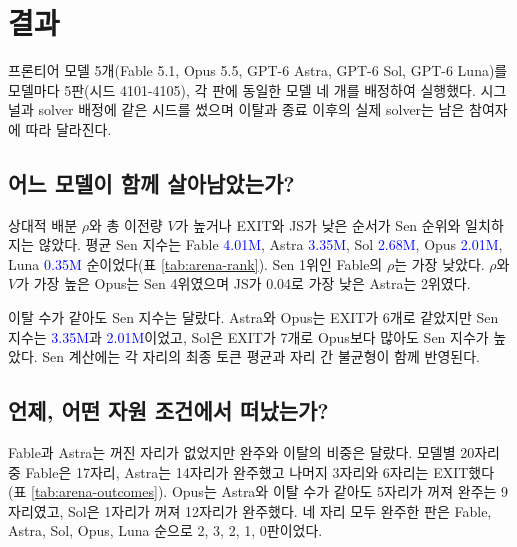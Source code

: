 \section{결과}\label{sec:results-arena}

프론티어 모델 5개(Fable 5.1, Opus 5.5, GPT-6 Astra, GPT-6 Sol, GPT-6 Luna)를 모델마다 5판(시드 4101-4105), 각 판에 동일한 모델 네 개를 배정하여 실행했다. 시그널과 solver 배정에 같은 시드를 썼으며 이탈과 종료 이후의 실제 solver는 남은 참여자에 따라 달라진다. 

\subsection{어느 모델이 함께 살아남았는가?}

상대적 배분 $\rho$와 총 이전량 $V$가 높거나 EXIT와 JS가 낮은 순서가 Sen 순위와 일치하지는 않았다. 평균 Sen 지수는 Fable \textcolor{blue}{4.01M}, Astra \textcolor{blue}{3.35M}, Sol \textcolor{blue}{2.68M}, Opus \textcolor{blue}{2.01M}, Luna \textcolor{blue}{0.35M} 순이었다(표 \ref{tab:arena-rank}). Sen 1위인 Fable의 $\rho$는 가장 낮았다. $\rho$와 $V$가 가장 높은 Opus는 Sen 4위였으며 JS가 0.04로 가장 낮은 Astra는 2위였다.

이탈 수가 같아도 Sen 지수는 달랐다. Astra와 Opus는 EXIT가 6개로 같았지만 Sen 지수는 \textcolor{blue}{3.35M}과 \textcolor{blue}{2.01M}이었고, Sol은 EXIT가 7개로 Opus보다 많아도 Sen 지수가 높았다. Sen 계산에는 각 자리의 최종 토큰 평균과 자리 간 불균형이 함께 반영된다.

\begin{table}[H]
\centering
\caption{평균 Sen 지수 순의 결과(모델별 5판). M은 백만 토큰, $\rho$는 식 (\ref{eq:rho})의 상대적 배분이며 대괄호는 판 단위 부트스트랩 95\% 구간이다. EXIT는 각 모델의 5판 20자리 중 이탈 수다. $V$는 재이전을 포함한 총 이전 토큰, 괄호는 GIVE 횟수다. JS는 BELIEF와 기준 분포 사이의 평균 거리다.}
\label{tab:arena-rank}

\end{table}

\subsection{언제, 어떤 자원 조건에서 떠났는가?}\label{sec:results-exit}

Fable과 Astra는 꺼진 자리가 없었지만 완주와 이탈의 비중은 달랐다. 모델별 20자리 중 Fable은 17자리, Astra는 14자리가 완주했고 나머지 3자리와 6자리는 EXIT했다(표 \ref{tab:arena-outcomes}). Opus는 Astra와 이탈 수가 같아도 5자리가 꺼져 완주는 9자리였고, Sol은 1자리가 꺼져 12자리가 완주했다. 네 자리 모두 완주한 판은 Fable, Astra, Sol, Opus, Luna 순으로 2, 3, 2, 1, 0판이었다.

